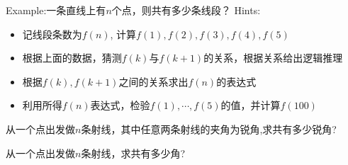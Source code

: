 \clearpage
Example:一条直线上有$n$个点，则共有多少条线段？
\clearpage
Hints:
\begin{itemize}
\item 记线段条数为$f(n)$, 计算$f(1), f(2), f(3), f(4), f(5)$
\item 根据上面的数据，猜测$f(k)$与$f(k+1)$的关系，根据关系给出逻辑推理
\item 根据$f(k), f(k+1)$之间的关系求出$f(n)$的表达式
\item 利用所得$f(n)$表达式，检验$f(1), \cdots, f(5)$的值，并计算$f(100)$
\end{itemize}

\clearpage
从一个点出发做$n$条射线，其中任意两条射线的夹角为锐角,求共有多少锐角?

从一个点出发做$n$条射线，求共有多少角?

